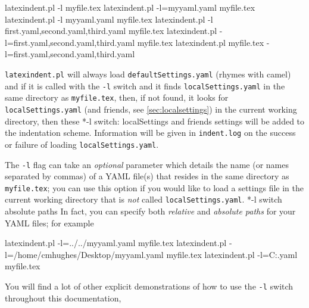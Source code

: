 	\begin{commandshell}
latexindent.pl -l myfile.tex
latexindent.pl -l=myyaml.yaml myfile.tex
latexindent.pl -l myyaml.yaml myfile.tex
latexindent.pl -l first.yaml,second.yaml,third.yaml myfile.tex
latexindent.pl -l=first.yaml,second.yaml,third.yaml myfile.tex
latexindent.pl myfile.tex -l=first.yaml,second.yaml,third.yaml 
\end{commandshell}

	\label{page:localswitch}
	\texttt{latexindent.pl} will always load \texttt{defaultSettings.yaml} (rhymes with
	camel) and if it is called with the \texttt{-l} switch and it finds
	\texttt{localSettings.yaml} in the same directory as \texttt{myfile.tex}, then, if not
	found, it looks for \texttt{localSettings.yaml} (and friends, see
	\vref{sec:localsettings}) in the current working directory, then
	these%
	*{-l switch: localSettings and
		friends} settings will be added to the indentation scheme. Information will be given in
	\texttt{indent.log} on the success or failure of loading \texttt{localSettings.yaml}.

	The \texttt{-l} flag can take an \emph{optional} parameter which details the name (or
	names separated by commas) of a YAML file(s) that resides in the same directory as
	\texttt{myfile.tex}; you can use this option if you would like to load a settings file in
	the current working directory that is \emph{not} called
	\texttt{localSettings.yaml}.%
	*{-l
		switch absolute paths} In fact, you can specify both \emph{relative} and \emph{absolute
		paths} for your YAML files; for example
	\begin{commandshell}
latexindent.pl -l=../../myyaml.yaml myfile.tex
latexindent.pl -l=/home/cmhughes/Desktop/myyaml.yaml myfile.tex
latexindent.pl -l=C:\Users\cmhughes\Desktop\myyaml.yaml myfile.tex
\end{commandshell}
	You will find a lot of other explicit demonstrations of how to use the \texttt{-l} switch
	throughout this documentation,


